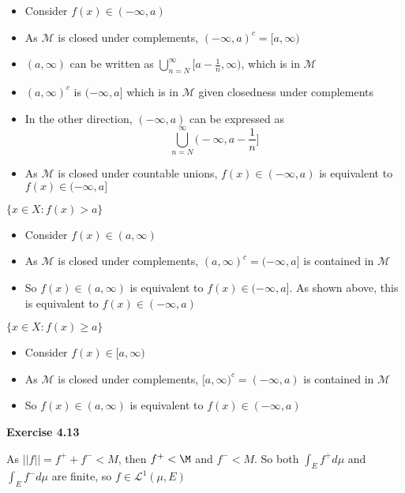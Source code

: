 \documentclass[letterpaper,12pt]{article}
\begin{document}
\begin{itemize}
  \item Consider $f(x) \in (-\infty, a)$
  \item As $\mathcal M$ is closed under complements, $(-\infty, a)^c = [a, \infty)$
  \item $(a, \infty)$ can be written as $\bigcup_{n=N}^\infty[a - \frac{1}{n}, \infty)$, which is in $\mathcal M$
  \item $(a, \infty)^c$ is $(-\infty, a]$ which is in $\mathcal M$ given closedness under complements
  \item In the other direction, $(-\infty, a)$ can be expressed as
      $$
      \bigcup_{n=N}^{\infty} \Big(-\infty, a - \frac{1}{n} \Big]
      $$
  \item As $\mathcal M$ is closed under countable unions, $f(x) \in (-\infty, a)$ is equivalent to $f(x) \in (-\infty, a]$
        
\end{itemize}

$\{ x \in X: f(x) > a \}$

\begin{itemize}
  \item Consider $f(x) \in (a, \infty)$
  \item As $\mathcal M$ is closed under complements, $(a, \infty)^c = (-\infty, a]$ is contained in $\mathcal M$ 
  \item So $f(x) \in (a, \infty)$ is equivalent to $f(x) \in (-\infty, a]$. As shown above, this is equivalent to $f(x) \in (-\infty, a)$
\end{itemize}

$\{ x \in X: f(x) \geq a \}$

\begin{itemize}
  \item Consider $f(x) \in [a, \infty)$
  \item As $\mathcal M$ is closed under complements, $[a, \infty)^c = (-\infty, a)$ is contained in $\mathcal M$ 
  \item So $f(x) \in (a, \infty)$ is equivalent to $f(x) \in (-\infty, a)$
\end{itemize}

\textbf{Exercise 4.13}

As $||f|| = f^+ + f^- < M$, then $f^+ < \M$ and $f^- < M$. So both $\int_E f^+ d \mu$ and $\int_E f^- d \mu$ are finite, so $f \in \mathscr{L}^1(\mu, E)$
\end{document}
